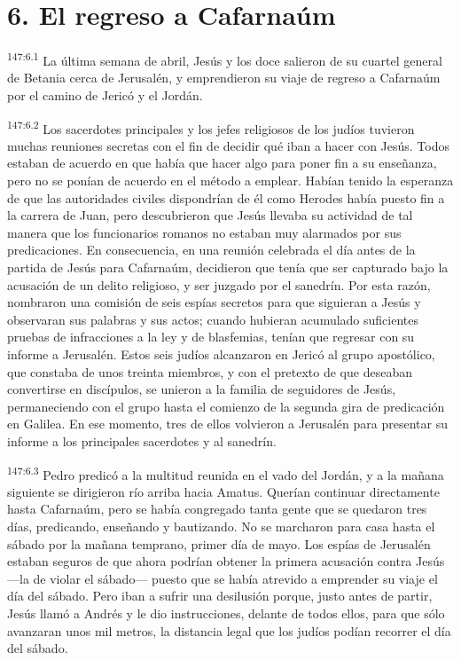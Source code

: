 \section*{6. El regreso a Cafarnaúm}
\par 
\textsuperscript{147:6.1} La última semana de abril, Jesús y los doce salieron de su cuartel general de Betania cerca de Jerusalén, y emprendieron su viaje de regreso a Cafarnaúm por el camino de Jericó y el Jordán.

\par 
\textsuperscript{147:6.2} Los sacerdotes principales y los jefes religiosos de los judíos tuvieron muchas reuniones secretas con el fin de decidir qué iban a hacer con Jesús. Todos estaban de acuerdo en que había que hacer algo para poner fin a su enseñanza, pero no se ponían de acuerdo en el método a emplear. Habían tenido la esperanza de que las autoridades civiles dispondrían de él como Herodes había puesto fin a la carrera de Juan, pero descubrieron que Jesús llevaba su actividad de tal manera que los funcionarios romanos no estaban muy alarmados por sus predicaciones. En consecuencia, en una reunión celebrada el día antes de la partida de Jesús para Cafarnaúm, decidieron que tenía que ser capturado bajo la acusación de un delito religioso, y ser juzgado por el sanedrín. Por esta razón, nombraron una comisión de seis espías secretos para que siguieran a Jesús y observaran sus palabras y sus actos; cuando hubieran acumulado suficientes pruebas de infracciones a la ley y de blasfemias, tenían que regresar con su informe a Jerusalén. Estos seis judíos alcanzaron en Jericó al grupo apostólico, que constaba de unos treinta miembros, y con el pretexto de que deseaban convertirse en discípulos, se unieron a la familia de seguidores de Jesús, permaneciendo con el grupo hasta el comienzo de la segunda gira de predicación en Galilea. En ese momento, tres de ellos volvieron a Jerusalén para presentar su informe a los principales sacerdotes y al sanedrín.

\par 
\textsuperscript{147:6.3} Pedro predicó a la multitud reunida en el vado del Jordán, y a la mañana siguiente se dirigieron río arriba hacia Amatus. Querían continuar directamente hasta Cafarnaúm, pero se había congregado tanta gente que se quedaron tres días, predicando, enseñando y bautizando. No se marcharon para casa hasta el sábado por la mañana temprano, primer día de mayo. Los espías de Jerusalén estaban seguros de que ahora podrían obtener la primera acusación contra Jesús ---la de violar el sábado--- puesto que se había atrevido a emprender su viaje el día del sábado. Pero iban a sufrir una desilusión porque, justo antes de partir, Jesús llamó a Andrés y le dio instrucciones, delante de todos ellos, para que sólo avanzaran unos mil metros, la distancia legal que los judíos podían recorrer el día del sábado.

